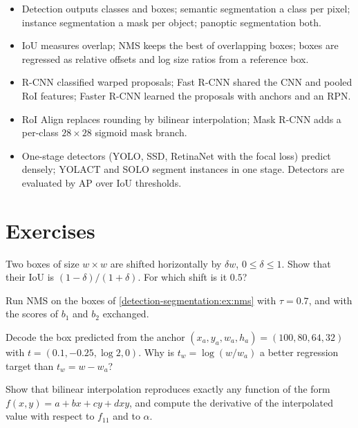 \begin{notechapter}
\begin{chaptersummary}
\begin{itemize}[nosep]
  \item Detection outputs classes and boxes; semantic segmentation a class per pixel; instance
        segmentation a mask per object; panoptic segmentation both.
  \item IoU measures overlap; NMS keeps the best of overlapping boxes; boxes are regressed as
        relative offsets and log size ratios from a reference box.
  \item R-CNN classified warped proposals; Fast R-CNN shared the CNN and pooled RoI features;
        Faster R-CNN learned the proposals with anchors and an RPN.
  \item RoI Align replaces rounding by bilinear interpolation; Mask R-CNN adds a per-class $28\times28$
        sigmoid mask branch.
  \item One-stage detectors (YOLO, SSD, RetinaNet with the focal loss) predict densely; YOLACT and
        SOLO segment instances in one stage. Detectors are evaluated by AP over IoU thresholds.
\end{itemize}
\end{chaptersummary}

\section*{Exercises}

\begin{exercise}\label{detection-segmentation:exr:1}
Two boxes of size $w\times w$ are shifted horizontally by $\delta w$, $0\leq\delta\leq1$. Show that their IoU is $(1 - \delta)/(1 + \delta)$.
For which shift is it $0.5$?
\end{exercise}

\begin{exercise}\label{detection-segmentation:exr:2}
Run NMS on the boxes of \cref{detection-segmentation:ex:nms} with $\tau = 0.7$, and with the scores of $b_1$ and $b_2$
exchanged.
\end{exercise}

\begin{exercise}\label{detection-segmentation:exr:3}
Decode the box predicted from the anchor $(x_a, y_a, w_a, h_a) = (100, 80, 64, 32)$ with
$t = (0.1, -0.25, \log2, 0)$. Why is $t_w = \log(w/w_a)$ a better regression target than $t_w = w - w_a$?
\end{exercise}

\begin{exercise}\label{detection-segmentation:exr:4}
Show that bilinear interpolation reproduces exactly any function of the form $f(x,y) = a + bx + cy + dxy$, and
compute the derivative of the interpolated value with respect to $f_{11}$ and to $\alpha$.
\end{exercise}
\end{notechapter}
